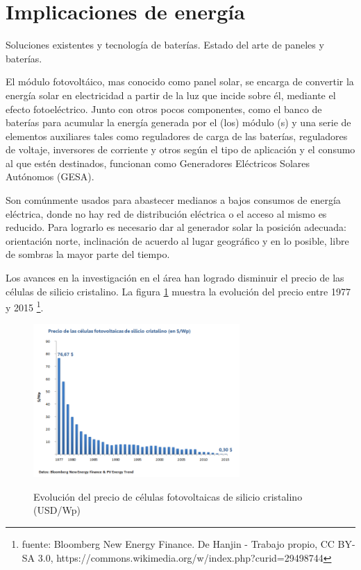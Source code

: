 \section{Implicaciones de energía}
\label{sec:energía}

Soluciones existentes y tecnología de baterías. Estado del arte de paneles y baterías.

El módulo fotovoltáico, mas conocido como panel solar, se encarga de convertir la energía solar en electricidad a partir de la luz que incide sobre él, mediante el efecto fotoeléctrico. Junto con otros pocos componentes, como el banco de baterías para acumular la energía generada por el (los) módulo (s) y una serie de elementos auxiliares tales como reguladores de carga de las baterías, reguladores de voltaje, inversores de corriente y otros según el tipo de aplicación y el consumo al que estén destinados, funcionan como Generadores Eléctricos Solares Autónomos (GESA).

Son comúnmente usados para abastecer medianos a bajos consumos de energía eléctrica, donde no hay red de distribución eléctrica o el acceso al mismo es reducido. Para lograrlo es necesario dar al generador solar la posición adecuada: orientación norte, inclinación de acuerdo al lugar geográfico y en lo posible, libre de sombras la mayor parte del tiempo.

Los avances en la investigación en el área han logrado disminuir el precio de las células de silicio cristalino. La figura \ref{fig:swanson} muestra la evolución del precio entre 1977 y 2015 \footnote{fuente: Bloomberg New Energy Finance. De Hanjin - Trabajo propio, CC BY-SA 3.0, https://commons.wikimedia.org/w/index.php?curid=29498744}.


\begin{figure}[h!]
	\centering
    \includegraphics[width=0.7\textwidth]{./Figures/SwansonEffect.png}
	\label{fig:swanson}
	\caption{Evolución del precio de células fotovoltaicas de silicio cristalino (USD/Wp)}
\end{figure}
